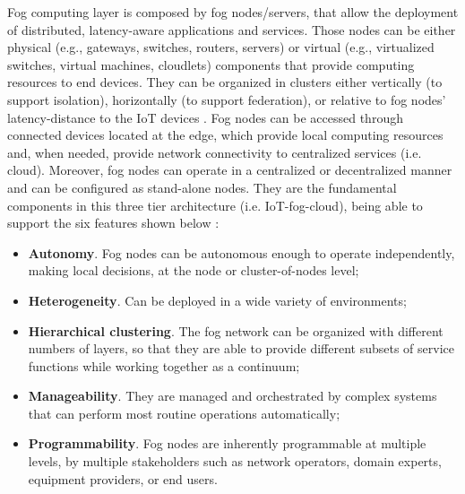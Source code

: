 \noindent\tab Fog computing layer is composed by fog nodes/servers, that allow the deployment of distributed, latency-aware applications and services. Those nodes can be either physical (e.g., gateways, switches, routers, servers) or virtual (e.g., virtualized switches, virtual machines, cloudlets) components that provide computing resources to end devices. They can be organized in clusters either vertically (to support isolation), horizontally (to support federation), or relative to fog nodes’ latency-distance to the IoT devices \cite{iorga2018fog}. Fog nodes can be accessed through connected devices located at the edge, which provide local computing resources and, when needed, provide network connectivity to centralized services (i.e. cloud). Moreover, fog nodes can operate in a centralized or decentralized manner and can be configured as stand-alone nodes. They are the fundamental components in this three tier architecture (i.e. IoT-fog-cloud), being able to support the six features shown below \cite{iorga2018fog}:
\begin{itemize}
	\item \textbf{Autonomy}. Fog nodes can be autonomous enough to operate independently, making local decisions, at the node or cluster-of-nodes level;
	\item \textbf{Heterogeneity}. Can be deployed in a wide variety of environments;
	\item \textbf{Hierarchical clustering}. The fog network can be organized with different numbers of layers, so that they are able to provide different subsets of service functions while working together as a continuum;
	\item \textbf{Manageability}. They are managed and orchestrated by complex systems that can perform most routine operations automatically;
	\item \textbf{Programmability}. Fog nodes are inherently programmable at multiple levels, by multiple stakeholders such as network operators, domain experts, equipment providers, or end users.
\end{itemize}

